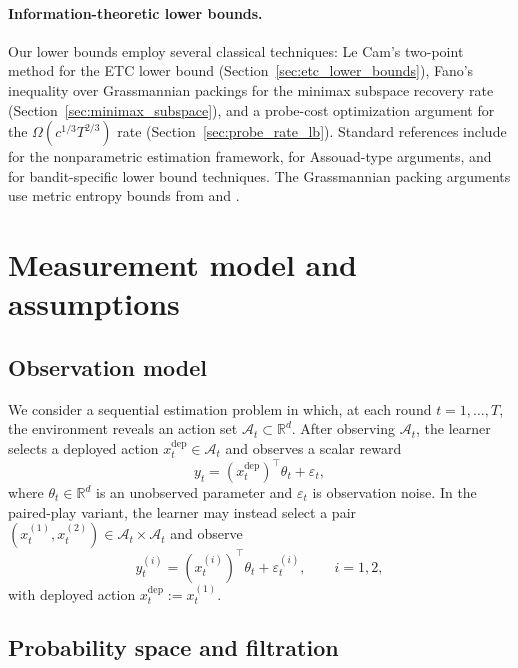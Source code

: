 \documentclass[12pt]{article}
\newcommand{\R}{\mathbb{R}}
\newcommand{\cA}{\mathcal{A}}
\theoremstyle{plain}
\theoremstyle{definition}
\begin{document}
\paragraph{Information-theoretic lower bounds.}
Our lower bounds employ several classical techniques: Le Cam's two-point method for the ETC lower bound (Section~\ref{sec:etc_lower_bounds}), Fano's inequality over Grassmannian packings for the minimax subspace recovery rate (Section~\ref{sec:minimax_subspace}), and a probe-cost optimization argument for the $\Omega(c^{1/3}T^{2/3})$ rate (Section~\ref{sec:probe_rate_lb}).
Standard references include \citet{tsybakov2009introduction} for the nonparametric estimation framework, \citet{yu1997assouad} for Assouad-type arguments, and \citet{lattimore2020bandit} for bandit-specific lower bound techniques. The Grassmannian packing arguments use metric entropy bounds from \citet{pajor1998metric} and \citet{edelman1998geometry}.


\section{Measurement model and assumptions}
\label{sec:model}

\subsection{Observation model}

We consider a sequential estimation problem in which, at each round $t = 1, \dots, T$, the environment reveals an action set $\cA_t \subset \R^d$. After observing $\cA_t$, the learner selects a deployed action $x_t^{\mathrm{dep}} \in \cA_t$ and observes a scalar reward
\begin{equation}
y_t = (x_t^{\mathrm{dep}})^\top \theta_t + \varepsilon_t,
\label{eq:reward_model}
\end{equation}
where $\theta_t \in \R^d$ is an unobserved parameter and $\varepsilon_t$ is observation noise. In the paired-play variant, the learner may instead select a pair $(x_t^{(1)}, x_t^{(2)}) \in \cA_t \times \cA_t$ and observe
\[
y_t^{(i)} = (x_t^{(i)})^\top \theta_t + \varepsilon_t^{(i)}, \qquad i = 1, 2,
\]
with deployed action $x_t^{\mathrm{dep}} := x_t^{(1)}$.

\subsection{Probability space and filtration}
\end{document}
